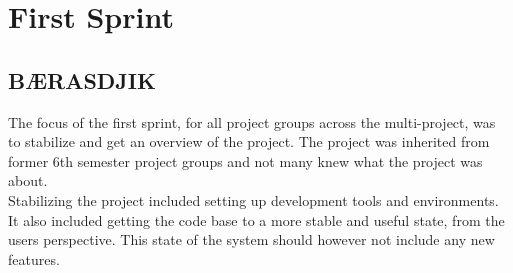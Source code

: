 \part{First Sprint}
\label{par:first_sprint}

\newevenside
\chapter{BÆRASDJIK} %
\label{cha:b_rasdjik}

The focus of the first sprint, for all project groups across the multi-project, was to stabilize and get an overview of the project. The project was inherited from former 6th semester project groups and not many knew what the \giraf project was about.
\\
Stabilizing the project included setting up development tools and environments. It also included getting the code base to a more stable and useful state, from the users perspective. This state of the system should however not include any new features.


